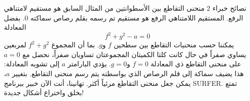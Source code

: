 \begin{surferPage}{نصائح خبراء 2}
منحنى التقاطع بين الأسطوانتين من المثال السابق هو مستقيم لامتناهي الرفع. المستقيم اللامتناهي الرفع هو مستقيم تم رسمه بقلم رصاص سماكته 0. بفضل المعادلة
\[ f^2+g^2-a=0\]
يمكننا حسب منحنيات التقاطع بين سطحين $f$ و$g$. بما أن المجموع $f^2+g^2$ لمربعين يساوي صفراً في حال كانت كلتا الكميتان المجموعتان تساويان صفراً، نحصل مع $ a=0 $ على منحنى التقاطع ذي المعادلة $ f=0 $ و$ g=0 $.
يؤدي البارامتر $ a $ إلى تشويه المعادلة: هذا يضيف سماكة إلى قلم الرصاص الذي بواسطته يتم رسم منحنى التقاطع. بتغيير $ a $، يمكن جعل منحنى التقاطع مرئياً أكثر.
\newline \newline
تهانينا، أنت الآن خبير ببرنامج \textenglish{SURFER}. تمتع بخلق واختراع أشكال جديدة!
\end{surferPage}
